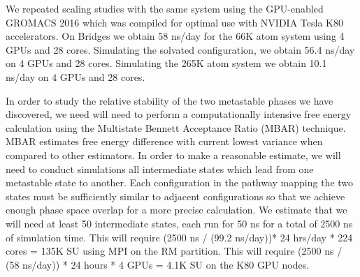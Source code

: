 We repeated scaling studies with the same system using the GPU-enabled 
GROMACS 2016 which was compiled for optimal use with NVIDIA Tesla K80
accelerators. On Bridges we obtain 58 ns/day for the 66K atom system
using 4 GPUs and 28 cores. Simulating the solvated configuration, we
obtain 56.4 ns/day on 4 GPUs and 28 cores. Simulating the 265K atom 
system we obtain 10.1 ns/day on 4 GPUs and 28 cores.

In order to study the relative stability of the two metastable phases 
we have discovered, we need will need to perform a computationally 
intensive free energy calculation using the Multistate Bennett
Acceptance Ratio (MBAR) technique. MBAR estimates free energy 
difference with current lowest variance when compared to other estimators.
In order to make a reasonable estimate, we will need to conduct 
simulations all intermediate states which lead from one metastable
state to another. Each configuration in the pathway mapping the two
states must be sufficiently similar to adjacent configurations so that
we achieve enough phase space overlap for a more precise calculation. 
We estimate that we will need at least 50 intermediate states, each run
for 50 ns for a total of 2500 ns of simulation time. This will require 
(2500 ns / (99.2 ns/day))* 24 hrs/day * 224 cores = 135K SU using
MPI on the RM partition. This will require (2500 ns / (58 ns/day)) * 24
hours * 4 GPUs = 4.1K SU on the K80 GPU nodes.


